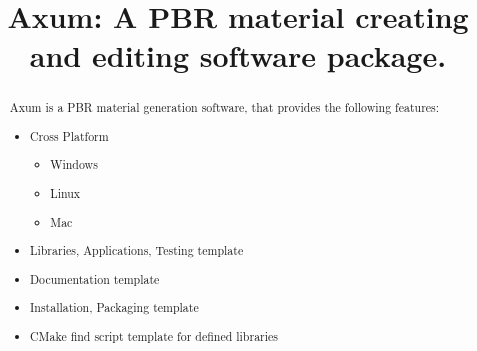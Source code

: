 \documentclass{article}
\begin{document}
\title{Axum: A PBR material creating and editing software package.}

\maketitle

\begin{abstract}
\noindent
Axum is a PBR material generation software, that provides the following features:

\begin{itemize}
  \item Cross Platform
  \begin{itemize}
    \item Windows
    \item Linux
    \item Mac
  \end{itemize}
  \item Libraries, Applications, Testing template
  \item Documentation template
  \item Installation, Packaging template
  \item CMake find script template for defined libraries
\end{itemize}

\end{abstract}

\setcounter{tocdepth}{2}
\tableofcontents

\newpage
\end{document}
